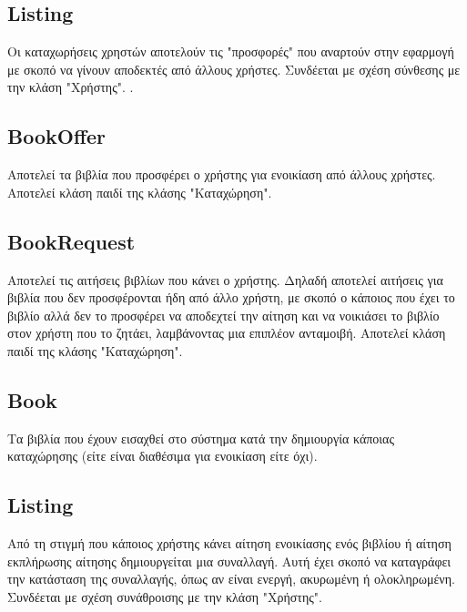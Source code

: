 \documentclass[12pt,a4paper]{article}
\begin{document}
\subsection{Listing}
Οι καταχωρήσεις χρηστών αποτελούν τις "προσφορές" που αναρτούν στην εφαρμογή με σκοπό να γίνουν αποδεκτές από άλλους χρήστες. Συνδέεται με σχέση σύνθεσης με την κλάση "Χρήστης".
.
\subsection{BookOffer}
Αποτελεί τα βιβλία που προσφέρει ο χρήστης για ενοικίαση από άλλους χρήστες. Αποτελεί κλάση παιδί της κλάσης "Καταχώρηση".

\subsection{BookRequest}
Αποτελεί τις αιτήσεις βιβλίων που κάνει ο χρήστης. Δηλαδή αποτελεί αιτήσεις για βιβλία που δεν προσφέρονται ήδη από άλλο χρήστη, με σκοπό ο κάποιος που έχει το βιβλίο αλλά δεν το προσφέρει να αποδεχτεί την αίτηση και να νοικιάσει το βιβλίο στον χρήστη που το ζητάει, λαμβάνοντας μια επιπλέον ανταμοιβή. Αποτελεί κλάση παιδί της κλάσης "Καταχώρηση".

\subsection{Book}
Τα βιβλία που έχουν εισαχθεί στο σύστημα κατά την δημιουργία κάποιας καταχώρησης (είτε είναι διαθέσιμα για ενοικίαση είτε όχι).

\subsection{Listing}
Από τη στιγμή που κάποιος χρήστης κάνει αίτηση ενοικίασης ενός βιβλίου ή αίτηση εκπλήρωσης αίτησης δημιουργείται μια συναλλαγή. Αυτή έχει σκοπό να καταγράφει την κατάσταση της συναλλαγής, όπως αν είναι ενεργή, ακυρωμένη ή ολοκληρωμένη. Συνδέεται με σχέση συνάθροισης με την κλάση "Χρήστης".
\end{document}
